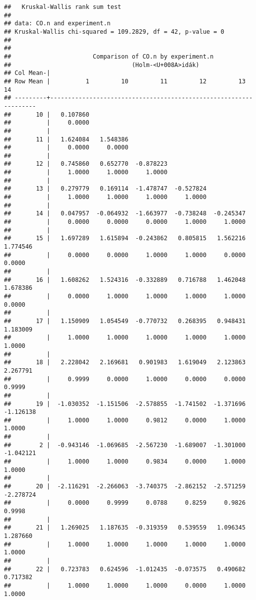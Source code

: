 \documentclass[12pt,]{article}
\begin{document}
\begin{verbatim}
##   Kruskal-Wallis rank sum test
## 
## data: CO.n and experiment.n
## Kruskal-Wallis chi-squared = 109.2829, df = 42, p-value = 0
## 
## 
##                       Comparison of CO.n by experiment.n                       
##                                  (Holm-<U+008A>idák)                                  
## Col Mean-|
## Row Mean |          1         10         11         12         13         14
## ---------+------------------------------------------------------------------
##       10 |   0.107860
##          |     0.0000
##          |
##       11 |   1.624084   1.548386
##          |     0.0000     0.0000
##          |
##       12 |   0.745860   0.652770  -0.878223
##          |     1.0000     1.0000     1.0000
##          |
##       13 |   0.279779   0.169114  -1.478747  -0.527824
##          |     1.0000     1.0000     1.0000     1.0000
##          |
##       14 |   0.047957  -0.064932  -1.663977  -0.738248  -0.245347
##          |     0.0000     0.0000     0.0000     1.0000     1.0000
##          |
##       15 |   1.697289   1.615894  -0.243862   0.805815   1.562216   1.774546
##          |     0.0000     0.0000     1.0000     1.0000     0.0000     0.0000
##          |
##       16 |   1.608262   1.524316  -0.332889   0.716788   1.462048   1.678386
##          |     0.0000     1.0000     1.0000     1.0000     1.0000     0.0000
##          |
##       17 |   1.150909   1.054549  -0.770732   0.268395   0.948431   1.183009
##          |     1.0000     1.0000     1.0000     1.0000     1.0000     1.0000
##          |
##       18 |   2.228042   2.169681   0.901983   1.619049   2.123863   2.267791
##          |     0.9999     0.0000     1.0000     0.0000     0.0000     0.9999
##          |
##       19 |  -1.030352  -1.151506  -2.578855  -1.741502  -1.371696  -1.126138
##          |     1.0000     1.0000     0.9812     0.0000     1.0000     1.0000
##          |
##        2 |  -0.943146  -1.069685  -2.567230  -1.689007  -1.301000  -1.042121
##          |     1.0000     1.0000     0.9834     0.0000     1.0000     1.0000
##          |
##       20 |  -2.116291  -2.266063  -3.740375  -2.862152  -2.571259  -2.278724
##          |     0.0000     0.9999     0.0788     0.8259     0.9826     0.9998
##          |
##       21 |   1.269025   1.187635  -0.319359   0.539559   1.096345   1.287660
##          |     1.0000     1.0000     1.0000     1.0000     1.0000     1.0000
##          |
##       22 |   0.723783   0.624596  -1.012435  -0.073575   0.490682   0.717382
##          |     1.0000     1.0000     1.0000     0.0000     1.0000     1.0000

\end{verbatim}
\end{document}
